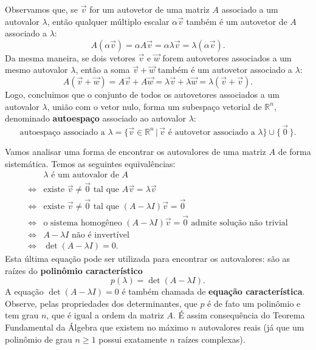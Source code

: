 \documentclass[../livro.tex]{subfiles}  %
\begin{document}
Observamos que, se $\vec{v}$ for um autovetor de uma matriz $A$ associado a um autovalor $\lambda$, então qualquer múltiplo escalar $\alpha \vec{v}$ também é um autovetor de $A$ associado a $\lambda$:
\begin{equation}
A (\alpha \vec{v}) = \alpha A \vec{v} = \alpha \lambda \vec{v} = \lambda (\alpha \vec{v}).
\end{equation} Da mesma maneira, se dois vetores $\vec{v}$ e $\vec{w}$ forem autovetores associados a um mesmo autovalor $\lambda$, então a soma $\vec{v} + \vec{w}$ também é um autovetor associado a $\lambda$:
\begin{equation}
A (\vec{v} + \vec{w}) = A \vec{v} + A \vec{w} =  \lambda \vec{v} + \lambda \vec{w} = \lambda (\vec{v} + \vec{v}).
\end{equation} Logo, concluimos que o conjunto de todos os autovetores associados a um autovalor $\lambda$, união com o vetor nulo, forma um subespaço vetorial de $\mathbb{R}^n$, denominado \textbf{autoespaço} associado ao autovalor $\lambda$:
\begin{equation}
\text{autoespaço associado a } \lambda = \big\{ \vec{v} \in \mathbb{R}^n \, | \, \vec{v} \text{ é autovetor associado a } \lambda \big\} \cup \{\, \vec{0}\, \}.
\end{equation}

Vamos analisar uma forma de encontrar os autovalores de uma matriz $A$ de forma sistemática. Temos as seguintes equivalências:
\begin{align*}
& \lambda \text{ é um autovalor de $A$} \\
\iff & \text{existe } \vec{v} \neq \vec{0} \text{ tal que } A \vec{v} = \lambda \vec{v} \\
\iff & \text{existe } \vec{v} \neq \vec{0} \text{ tal que } (A - \lambda I)\vec{v} = \vec{0} \\
\iff & \text{o sistema homogêneo } (A - \lambda I)\vec{v} = \vec{0} \text{ admite solução não trivial} \\
\iff & A - \lambda I \text{ não é invertível} \\
\iff & \det (A - \lambda I) = 0.
\end{align*}
Esta última equação pode ser utilizada para encontrar os autovalores: são as raízes do \textbf{polinômio característico}
\begin{equation}
p(\lambda) = \det (A - \lambda I).
\end{equation} A equação $\det (A - \lambda I) = 0$ é também chamada de \textbf{equação característica}. Observe, pelas propriedades dos determinantes, que $p$ é de fato um polinômio e tem grau $n$, que é igual a ordem da matriz $A$. É assim consequência do Teorema Fundamental da Álgebra que existem no máximo $n$ autovalores reais (já que um polinômio de grau $n\ge 1$ possui exatamente $n$ raízes complexas).
\end{document}
